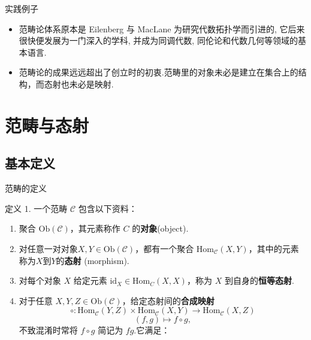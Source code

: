 \documentclass{beamer}
\newcommand\cat{\mathcal{C}}
\newcommand\obj[1]{\mathrm{Ob}(#1)}
\newcommand\Homc[3]{\mathrm{Hom}_{#1}(#2, #3)}
\begin{document}
	\begin{frame}{实践例子}
		\begin{itemize}[<+->]			
			\item 范畴论体系原本是 Eilenberg 与 MacLane 为研究代数拓扑学而引进的, 它后来很快便发展为一门深入的学科, 并成为同调代数, 同伦论和代数几何等领域的基本语言.
			\item 范畴论的成果远远超出了创立时的初衷.范畴里的对象未必是建立在集合上的结构，而态射也未必是映射.
			\begin{table}[h!]
				\centering
				\renewcommand{\arraystretch}{1.5} %
				\setlength{\tabcolsep}{5pt} %
			\end{table}
		\end{itemize}
	\end{frame}
	
	\section{范畴与态射}
	\subsection{基本定义}
	\begin{frame}{范畴的定义}
		\begin{exampleblock}{定义 1.}
			一个范畴 $\mathcal{C}$ 包含以下资料：
			\begin{enumerate}
				\item 聚合 $\mathrm{Ob}(\mathcal{C})$，其元素称作 $C$ 的\textbf{对象}(object).
				\item 对任意一对对象$X, Y \in \obj{\cat}$，都有一个聚合
				$\Homc{\cat}{X}{Y}$，其中的元素称为$X$到$Y$的\textbf{态射}
				(morphism).
				\item 对每个对象 $X$ 给定元素 $\mathrm{id}_X \in \mathrm{Hom}_C(X, X)$，称为 $X$ 到自身的\textbf{恒等态射}.
				\item 对于任意 $X, Y, Z \in \mathrm{Ob}(\cat)$，给定态射间的\textbf{合成映射}
				\[
				\circ : \mathrm{Hom}_{\cat}(Y, Z) \times \mathrm{Hom}_{\cat}(X, Y) \to \mathrm{Hom}_{\cat}(X, Z)
				\]
				\[
				(f, g) \mapsto f \circ g,
				\]
				不致混淆时常将 $f \circ g$ 简记为 $fg$.它满足：
			\end{enumerate}
		\end{exampleblock}
	\end{frame}
	
\end{document}
